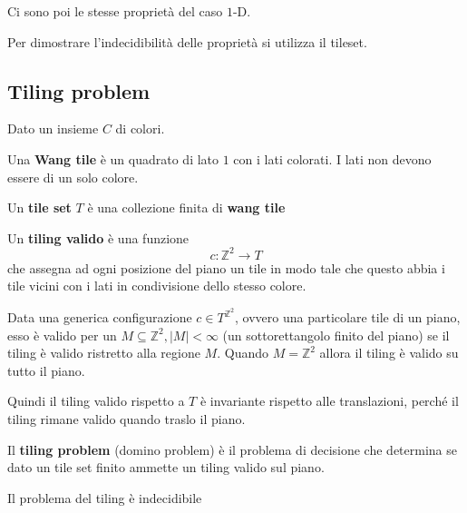 Ci sono poi le stesse proprietà del caso $1$-D.

Per dimostrare l'indecidibilità delle proprietà si utilizza il tileset.
\subsection{Tiling problem }
Dato un insieme $C$ di colori.

\begin{definizione} 
    Una \textbf{Wang tile} è un quadrato di lato $1$ con i lati colorati.
    I lati non devono essere di un solo colore.
\end{definizione}

\begin{definizione} 
    Un  \textbf{tile set} $T$ è una collezione finita di \textbf{wang tile}
\end{definizione}

\begin{definizione} 
    Un  \textbf{tiling valido} è una funzione
    $$c: \mathbb{Z}^2\rightarrow T$$
    che assegna ad ogni posizione del piano un tile in modo tale che questo abbia
    i tile vicini con i lati in condivisione dello stesso colore.
\end{definizione}

Data una generica configurazione $c\in T^{\mathbb{Z}^2}$, ovvero una particolare
tile di un piano, esso è valido per un $M\subseteq \mathbb{Z}^2, |M|<\infty$ (un sottorettangolo finito
del piano) se il tiling è valido ristretto alla regione $M$. Quando $M=\mathbb{Z}^2$
allora il tiling è valido su tutto il piano.

Quindi il tiling valido rispetto a $T$ è invariante rispetto alle translazioni,
perché il tiling rimane valido quando traslo il piano.

\begin{definizione} 
    Il \textbf{tiling problem} (domino problem) è il problema di decisione che determina se dato un
    tile set finito ammette un tiling valido sul piano.
\end{definizione}

\begin{teorema}
    Il problema del tiling è indecidibile
\end{teorema}


